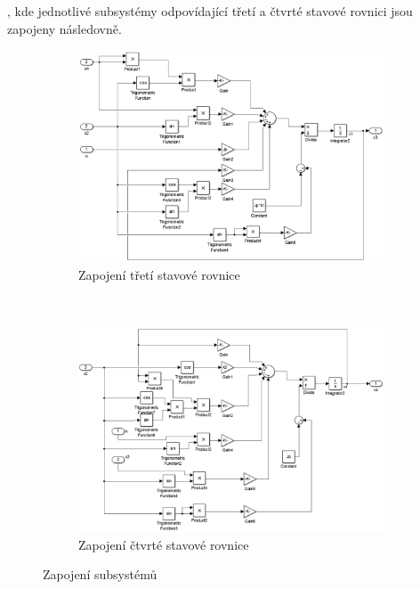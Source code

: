 \documentclass[11pt,a4paper]{article}
\begin{document}
, kde jednotlivé subsystémy odpovídající třetí a čtvrté stavové rovnici jsou zapojeny následovně.

\begin{figure}
        \centering
        \begin{subfigure}[b]{0.5\textwidth}
                \includegraphics[width=\textwidth]{schema_nelinearni_3difrov.jpg}
                \caption{Zapojení třetí stavové rovnice}
                \label{model:nelin:3diff}
        \end{subfigure}%
        ~ %
        \begin{subfigure}[b]{0.5\textwidth}
                \includegraphics[width=\textwidth]{schema_nelinearni_4difrov.jpg}
                \caption{Zapojení čtvrté stavové rovnice}
                \label{model:nelin:4diff}
        \end{subfigure}
        \caption{Zapojení subsystémů}
\end{figure}
  
\end{document}
